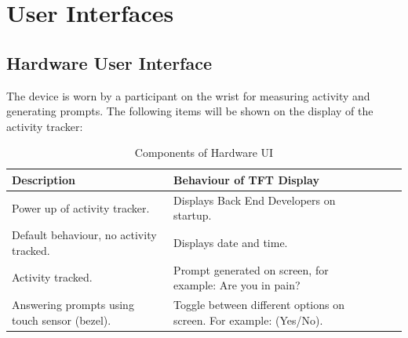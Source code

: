 \documentclass[12pt, titlepage]{article}
\begin{document}
\section{User Interfaces}


\subsection{Hardware User Interface}

The device is worn by a participant on the wrist for measuring activity and generating  prompts. The following items will be shown on the display of the activity tracker:
\begin{table}[H]
	\begin{tabularx}{1.05\textwidth} { 
		  | >{\centering\arraybackslash}X 
		  | >{\centering\arraybackslash}X 
		  | >{\centering\arraybackslash}X 
		  | >{\centering\arraybackslash}X | }
		 \hline
		 \textbf{Description} & \textbf{Behaviour of TFT Display} \\
		 \hline
		Power up of activity tracker. & Displays Back End Developers on startup.\\
		\hline
		 Default behaviour, no activity tracked.  & Displays date and time.\\
		 \hline
		   Activity tracked. & Prompt generated on screen, for example: Are you in pain?\\
		\hline 
		Answering prompts using touch sensor (bezel). & Toggle between different 				options on screen. For example: (Yes/No).\\
		\hline
	\end{tabularx}
\caption{\label{Hardware User Interface}Components of Hardware UI}  
\end{table}
\end{document}
